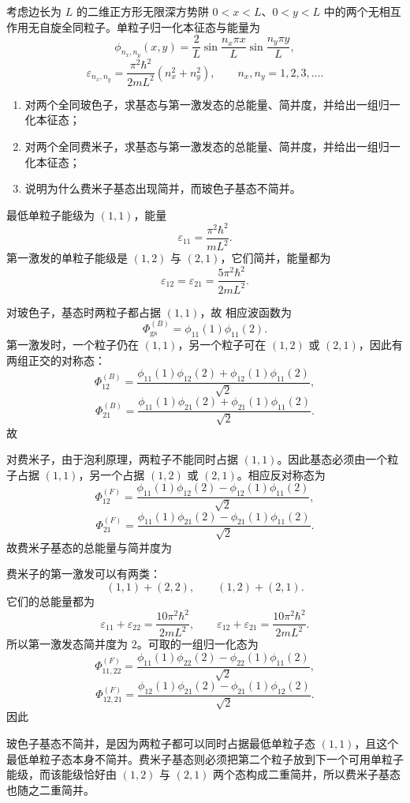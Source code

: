 \begin{question}
考虑边长为 $L$ 的二维正方形无限深方势阱 $0<x<L$、$0<y<L$ 中的两个无相互作用无自旋全同粒子。单粒子归一化本征态与能量为
\[
\phi_{n_x,n_y}(x,y)=\frac{2}{L}\sin\frac{n_x\pi x}{L}\sin\frac{n_y\pi y}{L},
\]
\[
\varepsilon_{n_x,n_y}=\frac{\pi^2\hbar^2}{2mL^2}(n_x^2+n_y^2),
\qquad n_x,n_y=1,2,3,\dots.
\]

\begin{enumerate}[label=(\arabic*),leftmargin=2.5em]
  \item 对两个全同玻色子，求基态与第一激发态的总能量、简并度，并给出一组归一化本征态；
  \item 对两个全同费米子，求基态与第一激发态的总能量、简并度，并给出一组归一化本征态；
  \item 说明为什么费米子基态出现简并，而玻色子基态不简并。
\end{enumerate}

\begin{solution}
最低单粒子能级为 $(1,1)$，能量
\[
\varepsilon_{11}=\frac{\pi^2\hbar^2}{mL^2}.
\]
第一激发的单粒子能级是 $(1,2)$ 与 $(2,1)$，它们简并，能量都为
\[
\varepsilon_{12}=\varepsilon_{21}=\frac{5\pi^2\hbar^2}{2mL^2}.
\]

对玻色子，基态时两粒子都占据 $(1,1)$，故
相应波函数为
\[
\Phi_{\mathrm{gs}}^{(B)}=\phi_{11}(1)\phi_{11}(2).
\]
第一激发时，一个粒子仍在 $(1,1)$，另一个粒子可在 $(1,2)$ 或 $(2,1)$，因此有两组正交的对称态：
\[
\Phi_{12}^{(B)}=\frac{\phi_{11}(1)\phi_{12}(2)+\phi_{12}(1)\phi_{11}(2)}{\sqrt2},
\]
\[
\Phi_{21}^{(B)}=\frac{\phi_{11}(1)\phi_{21}(2)+\phi_{21}(1)\phi_{11}(2)}{\sqrt2}.
\]
故

对费米子，由于泡利原理，两粒子不能同时占据 $(1,1)$。因此基态必须由一个粒子占据 $(1,1)$，另一个占据 $(1,2)$ 或 $(2,1)$。相应反对称态为
\[
\Phi_{12}^{(F)}=\frac{\phi_{11}(1)\phi_{12}(2)-\phi_{12}(1)\phi_{11}(2)}{\sqrt2},
\]
\[
\Phi_{21}^{(F)}=\frac{\phi_{11}(1)\phi_{21}(2)-\phi_{21}(1)\phi_{11}(2)}{\sqrt2}.
\]
故费米子基态的总能量与简并度为

费米子的第一激发可以有两类：
\[
(1,1)+(2,2),
\qquad
(1,2)+(2,1).
\]
它们的总能量都为
\[
\varepsilon_{11}+\varepsilon_{22}=\frac{10\pi^2\hbar^2}{2mL^2},
\qquad
\varepsilon_{12}+\varepsilon_{21}=\frac{10\pi^2\hbar^2}{2mL^2}.
\]
所以第一激发态简并度为 $2$。可取的一组归一化态为
\[
\Phi_{11,22}^{(F)}=\frac{\phi_{11}(1)\phi_{22}(2)-\phi_{22}(1)\phi_{11}(2)}{\sqrt2},
\]
\[
\Phi_{12,21}^{(F)}=\frac{\phi_{12}(1)\phi_{21}(2)-\phi_{21}(1)\phi_{12}(2)}{\sqrt2}.
\]
因此

玻色子基态不简并，是因为两粒子都可以同时占据最低单粒子态 $(1,1)$，且这个最低单粒子态本身不简并。费米子基态则必须把第二个粒子放到下一个可用单粒子能级，而该能级恰好由 $(1,2)$ 与 $(2,1)$ 两个态构成二重简并，所以费米子基态也随之二重简并。
\end{solution}
\end{question}


